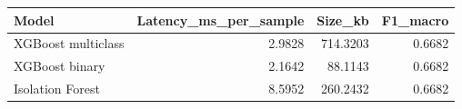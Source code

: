 \begin{tabular}{lrrr}
\toprule
Model & Latency_ms_per_sample & Size_kb & F1_macro \\
\midrule
XGBoost multiclass & 2.9828 & 714.3203 & 0.6682 \\
XGBoost binary & 2.1642 & 88.1143 & 0.6682 \\
Isolation Forest & 8.5952 & 260.2432 & 0.6682 \\
\bottomrule
\end{tabular}
